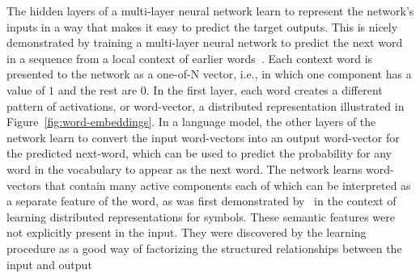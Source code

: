 \documentclass[10pts]{article}
\newcommand{\citep}[1]{\cite{#1}}
\newcommand{\citet}[1]{\cite{#1}}
\begin{document}
The hidden layers of a multi-layer neural network learn to represent
the network's inputs in a way that makes it easy to predict the target
outputs. This is nicely demonstrated by training a multi-layer neural
network to predict the next word in a sequence from a local context of
earlier words~\citep{BenDucVin01-short}.  Each context word is
presented to the network as a one-of-N vector, i.e., in which one
component has a value of $1$ and the rest are $0$. 
%
In the first layer, each word
creates a different pattern of activations, or word-vector, a distributed
representation illustrated
in Figure~\ref{fig:word-embeddings}.  In a language model, the other
layers of the network learn to convert the input word-vectors into an
output word-vector for the predicted next-word, which can be used to
predict the probability for any word in the vocabulary to appear as
the next word.  The network learns word-vectors that contain many
active components each of which can be interpreted as a separate
feature of the word, as was first demonstrated by~\citet{RHW} in the context
of learning distributed representations for symbols.
These semantic features were not explicitly present
in the input.  They were discovered by the learning procedure as a good way
of factorizing the structured relationships between the input and output
\end{document}
